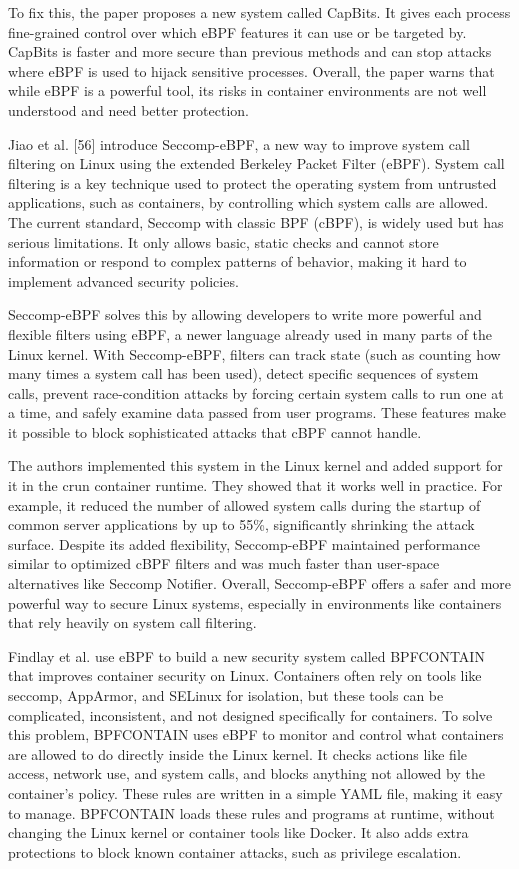 \documentclass[12pt]{report}
\begin{document}
\begin{doublespace}
To fix this, the paper proposes a new system called CapBits. It gives each process fine-grained control over which eBPF features it can use or be targeted by. CapBits is faster and more secure than previous methods and can stop attacks where eBPF is used to hijack sensitive processes. Overall, the paper warns that while eBPF is a powerful tool, its risks in container environments are not well understood and need better protection.

Jiao et al. [56] introduce Seccomp-eBPF, a new way to improve system call filtering on Linux using the extended Berkeley Packet Filter (eBPF). System call filtering is a key technique used to protect the operating system from untrusted applications, such as containers, by controlling which system calls are allowed. The current standard, Seccomp with classic BPF (cBPF), is widely used but has serious limitations. It only allows basic, static checks and cannot store information or respond to complex patterns of behavior, making it hard to implement advanced security policies.

Seccomp-eBPF solves this by allowing developers to write more powerful and flexible filters using eBPF, a newer language already used in many parts of the Linux kernel. With Seccomp-eBPF, filters can track state (such as counting how many times a system call has been used), detect specific sequences of system calls, prevent race-condition attacks by forcing certain system calls to run one at a time, and safely examine data passed from user programs. These features make it possible to block sophisticated attacks that cBPF cannot handle.

The authors implemented this system in the Linux kernel and added support for it in the crun container runtime. They showed that it works well in practice. For example, it reduced the number of allowed system calls during the startup of common server applications by up to 55\%, significantly shrinking the attack surface. Despite its added flexibility, Seccomp-eBPF maintained performance similar to optimized cBPF filters and was much faster than user-space alternatives like Seccomp Notifier. Overall, Seccomp-eBPF offers a safer and more powerful way to secure Linux systems, especially in environments like containers that rely heavily on system call filtering.

Findlay et al. \cite{findlay2021bpfcontain} use eBPF to build a new security system called BPFCONTAIN that improves container security on Linux. Containers often rely on tools like seccomp, AppArmor, and SELinux for isolation, but these tools can be complicated, inconsistent, and not designed specifically for containers. To solve this problem, BPFCONTAIN uses eBPF to monitor and control what containers are allowed to do directly inside the Linux kernel. It checks actions like file access, network use, and system calls, and blocks anything not allowed by the container’s policy. These rules are written in a simple YAML file, making it easy to manage. BPFCONTAIN loads these rules and programs at runtime, without changing the Linux kernel or container tools like Docker. It also adds extra protections to block known container attacks, such as privilege escalation.



\end{doublespace}
\end{document}
